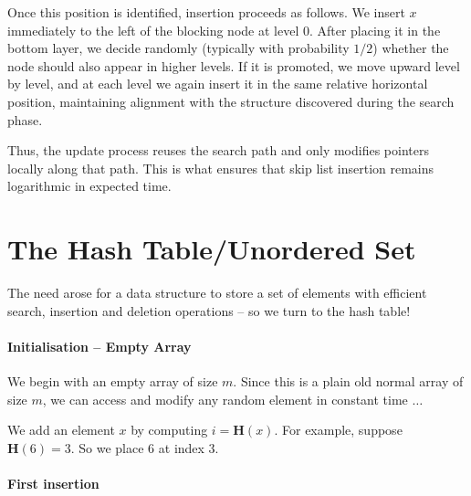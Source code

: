 \documentclass[11pt,openany]{book}
\begin{document}
Once this position is identified, insertion proceeds as follows. We insert \(x\) immediately to the left of the blocking node at level 
\(0\). After placing it in the bottom layer, we decide randomly (typically 
with probability \(1/2\)) whether the node should also appear 
in higher levels. If it is promoted, we move upward level by level, and 
at each level we again insert it in the same relative horizontal position, 
maintaining alignment with the structure discovered during the search phase.

Thus, the update process reuses the search path and only modifies pointers locally 
along that path. This is what ensures that skip list insertion remains logarithmic in expected time.



\section[The Hash Table]{The Hash Table/Unordered Set}

The need arose for a data structure to store a set of elements with efficient search, 
insertion and deletion operations -- so we turn to the hash table!

\paragraph{Initialisation -- Empty Array}

We begin with an empty array of size \(m\). Since this is a plain old normal 
array of size \(m\), we can access and modify 
any random element in constant time $\dots$

\begin{center}
\end{center}

We add an element \(x\) by computing $i=\mathbf{H}(x)$. For example, 
suppose $\mathbf{H}(6)=3$. So we place \(6\) at index \(3\).

\paragraph{First insertion}

\begin{center}
\end{center}
\end{document}

